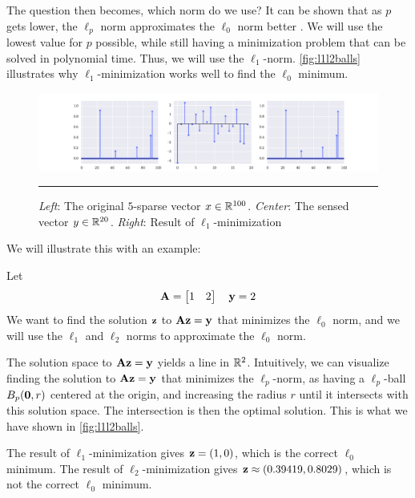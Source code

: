 The question then becomes, which norm do we use? It can be shown that  as $ p $ gets lower, the $ \ell_{p} $ norm approximates the $ \ell_{0} $ norm better \cite[Section 4.1]{foucart13intro}. We will use the lowest value for $ p $ possible, while still having a minimization problem that can be solved in polynomial time. Thus, we will use the $ \ell_{1} $-norm. \cref{fig:l1l2balls} illustrates why $ \ell_{1} $-minimization works well to find the $ \ell_{0} $ minimum. 
\begin{figure}[t]
	\centering
	\includegraphics[width=\textwidth]{figs/figure_1h.pdf}
	\caption{\textit{Left}: The original $ 5 $-sparse vector $ x \in \mathbb{R}^{100} $. \textit{Center}: The sensed vector $ y \in \mathbb{R}^{20} $. \textit{Right}: Result of $ \ell_{1} $-minimization}
	\label{fig:l1min}
	\vspace{4pt}\hrule
\end{figure}

We will illustrate this with an example:

\begin{example} \label{ex:l1l2min}
Let
\[ 
	\mathbf{A} = \begin{bmatrix}1 & 2\end{bmatrix} \quad \mathbf{y} = 2
\]
We want to find the solution $ \mathbf{z} $ to $ \mathbf{A}\mathbf{z} = \mathbf{y} $ that minimizes the $ \ell_{0} $ norm, and we will use the $ \ell_{1} $ and $ \ell_{2} $ norms to approximate the $ \ell_{0} $ norm.

The solution space to $ \mathbf{A}\mathbf{z} = \mathbf{y} $ yields a line in $ \mathbb{R}^{2} $. Intuitively, we can visualize finding the solution to $ \mathbf{A}\mathbf{z} = \mathbf{y} $ that minimizes the $ \ell_{p} $-norm, as having a $ \ell_{p} $-ball $ B_{p}(\mathbf{0}, r) $ centered at the origin, and increasing the radius $ r $ until it intersects with this solution space. The intersection is then the optimal solution. This is what we have shown in \cref{fig:l1l2balls}.

The result of $ \ell_{1} $-minimization gives $ \mathbf{z} = (1, 0) $, which is the correct $ \ell_{0} $ minimum. The result of $ \ell_{2} $-minimization gives $ \mathbf{z} \approx (0.39419, 0.8029) $, which is not the correct $ \ell_{0} $ minimum. 
\end{example}




